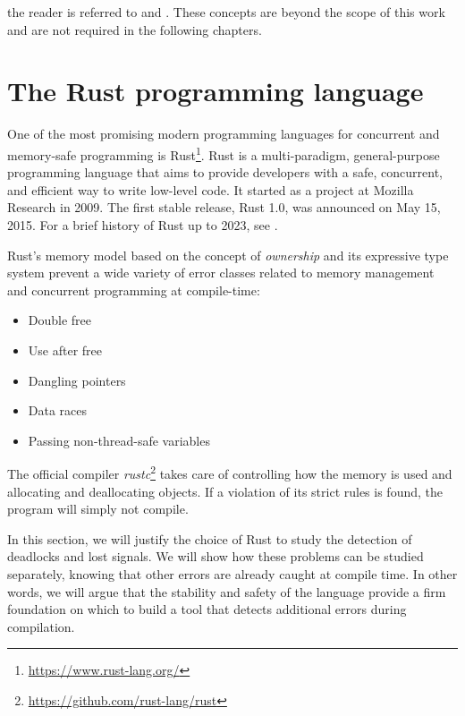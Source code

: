 the reader is referred to \cite{murata1989} and \cite{peterson1981}.
These concepts are beyond the scope of this work and are not required in the following chapters.

\section{The Rust programming language}

One of the most promising modern programming languages
for concurrent and memory-safe programming is Rust\footnote{\url{https://www.rust-lang.org/}}.
Rust is a multi-paradigm, general-purpose programming language that aims to provide developers
with a safe, concurrent, and efficient way to write low-level code.
It started as a project at Mozilla Research in 2009.
The first stable release, Rust 1.0, was announced on May 15, 2015.
For a brief history of Rust up to 2023, see \cite{thompson2023mit}.

Rust's memory model based on the concept of \emph{ownership} and its expressive type system prevent
a wide variety of error classes related to memory management and concurrent programming at compile-time:

\begin{itemize}
    \item Double free \cite[Cap. 4.1]{rust-book}
    \item Use after free \cite[Cap. 4.1]{rust-book}
    \item Dangling pointers \cite[Cap. 4.2]{rust-book}
    \item Data races \cite[Cap. 4.2]{rust-book}
    \item Passing non-thread-safe variables \cite[Cap. 16.4]{rust-book}
\end{itemize}

The official compiler \emph{rustc}\footnote{\url{https://github.com/rust-lang/rust}}
takes care of controlling how the memory is used and allocating and deallocating objects.
If a violation of its strict rules is found, the program will simply not compile.

In this section, we will justify the choice of Rust to study the detection of deadlocks and lost signals.
We will show how these problems can be studied separately, knowing that other errors are already caught at compile time.
In other words, we will argue that the stability and safety of the language provide a firm foundation
on which to build a tool that detects additional errors during compilation.

